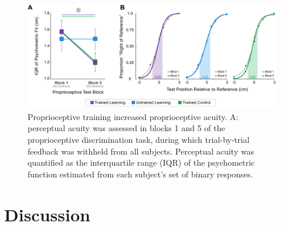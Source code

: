 \documentclass[twocolumn]{preep}
\begin{document}
\begin{figure}
  \centering
  \includegraphics[width=\textwidth]{percep.pdf}
  \caption{Proprioceptive training increased proprioceptive acuity. A:
    perceptual acuity was assessed in blocks 1 and 5 of the
    proprioceptive discrimination task, during which trial-by-trial
    feedback was withheld from all subjects. Perceptual acuity was
    quantified as the interquartile range (IQR) of the psychometric
    function estimated from each subject’s set of binary responses.}
  \label{fig:percep}
\end{figure}


\section*{Discussion}
\lipsum[15-20]




\end{document}
